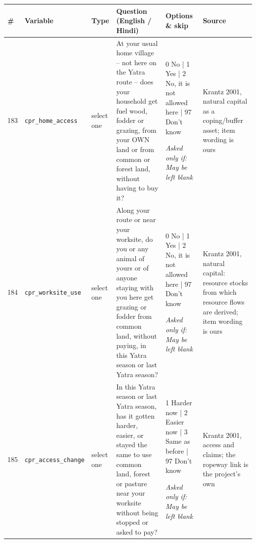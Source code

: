 \documentclass[9pt,a4paper,landscape]{article}
\begin{document}
\begin{longtable}{@{}p{0.5cm}p{3.3cm}p{1.7cm}p{7.3cm}p{5.6cm}p{5.4cm}@{}}
\toprule \footnotesize\textbf{\#} & \footnotesize\textbf{Variable} & \footnotesize\textbf{Type} & \footnotesize\textbf{Question (English / Hindi)} & \footnotesize\textbf{Options {\&} skip} & \footnotesize\textbf{Source}\\ \midrule
\endhead
\footnotesize 183 & \footnotesize\texttt{cpr\_home\_access} & \scriptsize select one & \footnotesize At your usual home village -- not here on the Yatra route -- does your household get fuel wood, fodder or grazing, from your OWN land or from common or forest land, without having to buy it?\par\vspace{1pt}{\footnotesize\color{hdr}{\hifont आपके असली घर पर — यहाँ यात्रा के रास्ते पर नहीं — क्या आपके घर को लकड़ी, चारा या जानवर चराने की जगह, अपनी ज़मीन से या साझा या जंगल की ज़मीन से, बिना पैसे दिए मिल जाती है?}} & \scriptsize 0 No | 1 Yes | 2 No, it is not allowed here | 97 Don't know\par\vspace{1pt}\textit{Asked only if: May be left blank} & \scriptsize Krantz 2001, natural capital as a coping/buffer asset; item wording is ours\\
\footnotesize 184 & \footnotesize\texttt{cpr\_worksite\_use} & \scriptsize select one & \footnotesize Along your route or near your worksite, do you or any animal of yours or of anyone staying with you here get grazing or fodder from common land, without paying, in this Yatra season or last Yatra season?\par\vspace{1pt}{\footnotesize\color{hdr}{\hifont इस यात्रा सीज़न या पिछले यात्रा सीज़न में, क्या आपको या आपके किसी जानवर को, या आपके साथ यहाँ रहने वाले किसी को, रास्ते पर या काम की जगह के पास साझा ज़मीन से बिना पैसे दिए चारा या चरागाह मिली?}} & \scriptsize 0 No | 1 Yes | 2 No, it is not allowed here | 97 Don't know\par\vspace{1pt}\textit{Asked only if: May be left blank} & \scriptsize Krantz 2001, natural capital: resource stocks from which resource flows are derived; item wording is ours\\
\footnotesize 185 & \footnotesize\texttt{cpr\_access\_change} & \scriptsize select one & \footnotesize In this Yatra season or last Yatra season, has it gotten harder, easier, or stayed the same to use common land, forest or pasture near your worksite without being stopped or asked to pay?\par\vspace{1pt}{\footnotesize\color{hdr}{\hifont इस यात्रा सीज़न या पिछले यात्रा सीज़न में, अपने काम की जगह के पास साझा ज़मीन, जंगल या चरागाह का बिना रोक-टोक या पैसे दिए इस्तेमाल करना — पहले से मुश्किल हुआ है, आसान हुआ है, या वैसा ही है?}} & \scriptsize 1 Harder now | 2 Easier now | 3 Same as before | 97 Don't know\par\vspace{1pt}\textit{Asked only if: May be left blank} & \scriptsize Krantz 2001, access and claims; the ropeway link is the project's own\\

\end{longtable}
\end{document}
